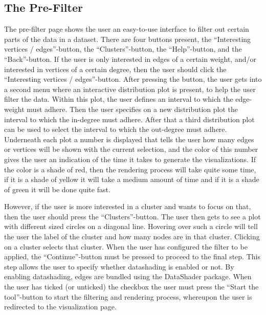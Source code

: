 \documentclass[journal]{vgtc}                %
\begin{document}
\subsection{The Pre-Filter} \label{sect:pre-filter} %
The pre-filter page shows the user an easy-to-use interface to filter out certain parts of the data in a dataset. There are four buttons present, the ``Interesting vertices / edges''-button, the ``Clusters''-button, the ``Help''-button, and the ``Back''-button. If the user is only interested in edges of a certain weight, and/or interested in vertices of a certain degree, then the user should click the ``Interesting vertices / edges''-button. After pressing the button, the user gets into a second menu where an interactive distribution plot is present, to help the user filter the data. Within this plot, the user defines an interval to which the edge-weight must adhere. Then the user specifies on a new distribution plot the interval to which the in-degree must adhere. After that a third distribution plot can be used to select the interval to which the out-degree must adhere. Underneath each plot a number is displayed that tells the user how many edges or vertices will be shown with the current selection, and the color of this number gives the user an indication of the time it takes to generate the visualizations. If the color is a shade of red, then the rendering process will take quite some time, if it is a shade of yellow it will take a medium amount of time and if it is a shade of green it will be done quite fast.

However, if the user is more interested in a cluster and wants to focus on that, then the user should press the ``Clusters''-button. The user then gets to see a plot with different sized circles on a diagonal line. Hovering over such a circle will tell the user the label of the cluster and how many nodes are in that cluster. Clicking on a cluster selects that cluster. When the user has configured the filter to be applied, the ``Continue''-button must be pressed to proceed to the final step. This step allows the user to specify whether datashading is enabled or not. By enabling datashading, edges are bundled using the DataShader package. When the user has ticked (or unticked) the checkbox the user must press the ``Start the tool''-button to start the filtering and rendering process, whereupon the user is redirected to the visualization page.
\end{document}

